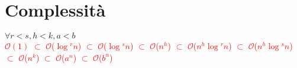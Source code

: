 \documentclass[../cheatSheetAlgoritmi.tex]{subfiles}
\begin{document}
\section{Complessità}
$\forall r < s, h < k, a < b$\\
\textcolor{red}{$\mathcal{O}(1)$ $\subset$ $\mathcal{O}$($\log$$^{r}n$) $\subset$ $\mathcal{O}$($\log$$^{s}n$) $\subset$ $\mathcal{O}$($n^{h}$) $\subset$ $\mathcal{O}$($n^{h}$$\log$$^{r}n$)  $\subset$ $\mathcal{O}$($n^{h}$$\log$$^{s}n$) $\subset$ $\mathcal{O}$($n^{k}$) $\subset$ $\mathcal{O}$($a^{n}$) $\subset$ $\mathcal{O}$($b^{n}$)}
\newpage
\end{document}
